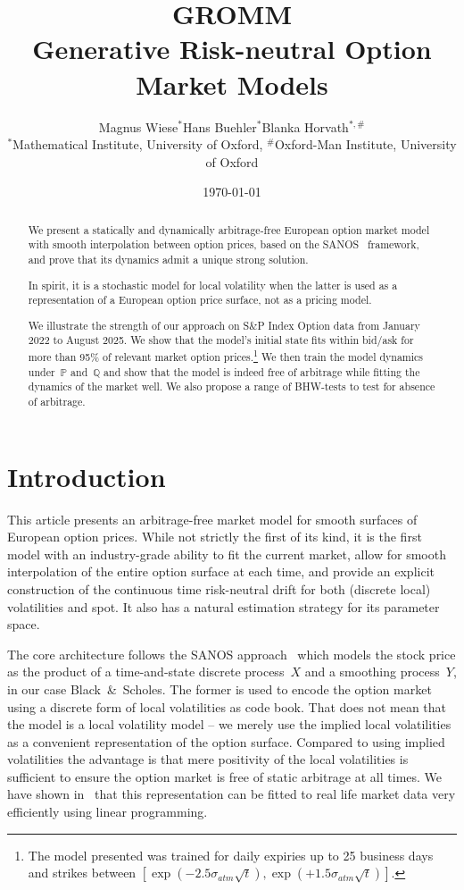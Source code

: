 \documentclass[11pt]{article}
\title{%
  \textbf{GROMM}\\[6pt]
  \large Generative Risk-neutral Option Market Models
}
\author{Magnus Wiese$^{*}$\qquad Hans Buehler$^{*}$\qquad Blanka Horvath$^{*,\#}$\\[0.6em]
  {\small $^{*}$Mathematical Institute, University of Oxford, 
  $^{\#}$Oxford-Man Institute, University of Oxford}}
\date{\today}
\newcommand{\Q}{\mathbb Q}
\newcommand{\PP}{\mathbb P}
\theoremstyle{plain}
\theoremstyle{definition}
\theoremstyle{remark}
\begin{document}
\maketitle

\begin{abstract}
    We present a statically and dynamically arbitrage-free European option market model with smooth
    interpolation between option prices, based on the SANOS~\cite{SANOS2026} framework, and prove that its dynamics admit a unique strong solution. 

    In spirit,
    it is a stochastic model for local volatility when the latter is used as a representation of a European option price surface, not as a pricing model.

  We illustrate the strength of our approach on S\&P Index Option data from January 2022 to August 2025.
  We show that the model's initial state fits within bid/ask for more than 95\% of relevant market option prices.\footnote{
        The model presented was trained for daily expiries up to 25 business days and strikes between $[\exp(-2.5 \sigma_{atm} \sqrt{t}), \exp(+1.5 \sigma_{atm} \sqrt{t})]$.}
    We then train the model dynamics under~$\PP$ and~$\Q$ and show that the model is indeed free of arbitrage
    while fitting the dynamics of the market well.
    We also propose a range of BHW-tests to test for absence of arbitrage. 
\end{abstract}

\tableofcontents


\section{Introduction}\label{sec:intro}

This article presents an arbitrage-free market model for smooth surfaces of European option prices. While not strictly the first of its kind,
it is the first model with an industry-grade ability to fit the current market, allow for smooth interpolation of the entire option surface at each time,
and provide an explicit construction of the continuous time risk-neutral drift for both (discrete local) volatilities and spot. It also has a natural
estimation strategy for its parameter space.

The core architecture follows the SANOS approach~\cite{SANOS2026} which models the stock price as the product
of a time-and-state discrete process~$X$ and a smoothing process~$Y$, in our case Black~\&~Scholes.
The former is used to encode the option market using a discrete form of local volatilities as code book. That does not mean
that the model is a local volatility model -- we merely use the implied local volatilities as a convenient representation of the option surface.
Compared to using implied volatilities the advantage is that mere positivity of the local volatilities is sufficient to ensure
the option market is free of static arbitrage at all times. We have shown in~\cite{SANOS2026} that this representation
can be fitted to real life market data very efficiently using linear programming.
\end{document}

